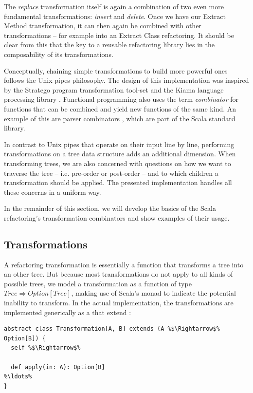 The \textit{replace} transformation itself is again a combination of two even more fundamental transformations: \textit{insert} and \textit{delete}. Once we have our Extract Method transformation, it can then again be combined with other transformations -- for example into an Extract Class refactoring. It should be clear from this that the key to a reusable refactoring library lies in the composability of its transformations. 

Conceptually, chaining simple transformations to build more powerful ones follows the Unix pipes philosophy. The design of this implementation was inspired by the Stratego program transformation tool-set \cite{Stratego} and the Kiama language processing library \cite{Kiama}. Functional programming also uses the term \textit{combinator} for functions that can be combined and yield new functions of the same kind. An example of this are parser combinators \cite{ParserCombinators}, which are part of the Scala standard library.

In contrast to Unix pipes that operate on their input line by line, performing transformations on a tree data structure adds an additional dimension. When transforming trees, we are also concerned with questions on how we want to traverse the tree -- i.e. pre-order or post-order -- and to which children a transformation should be applied. The presented implementation handles all these concerns in a uniform way.

In the remainder of this section, we will develop the basics of the Scala refactoring's transformation combinators and show examples of their usage.

\subsection{Transformations}

A refactoring transformation is essentially a function that transforms a tree into an other tree. But because most transformations do not apply to all kinds of possible trees, we model a transformation as a function of type $Tree\Rightarrow Option[Tree]$, making use of Scala's  monad to indicate the potential inability to transform. In the actual implementation, the transformations are implemented generically as a  that extend :

\begin{lstlisting}
abstract class Transformation[A, B] extends (A %$\Rightarrow$% Option[B]) {
  self %$\Rightarrow$%

  def apply(in: A): Option[B]
%\ldots%
}
\end{lstlisting}

